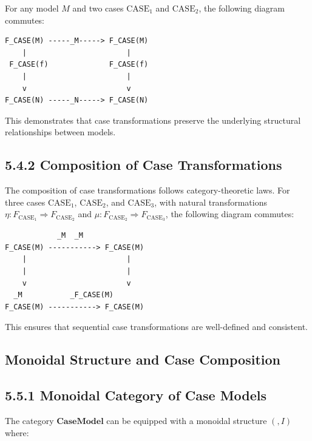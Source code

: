 \documentclass[
  11pt,
  letterpaper,
]{article}
\begin{document}
For any model \(M\) and two cases \(\text{CASE}_1\) and
\(\text{CASE}_2\), the following diagram commutes:

\begin{verbatim}
F_CASE(M) -----_M-----> F_CASE(M)
    |                       |
 F_CASE(f)              F_CASE(f)
    |                       |
    v                       v
F_CASE(N) -----_N-----> F_CASE(N)
\end{verbatim}

This demonstrates that case transformations preserve the underlying
structural relationships between models.

\hypertarget{composition-of-case-transformations}{%
\subsection{5.4.2 Composition of Case
Transformations}\label{composition-of-case-transformations}}

The composition of case transformations follows category-theoretic laws.
For three cases \(\text{CASE}_1\), \(\text{CASE}_2\), and
\(\text{CASE}_3\), with natural transformations
\(\eta: F_{\text{CASE}_1} \Rightarrow F_{\text{CASE}_2}\) and
\(\mu: F_{\text{CASE}_2} \Rightarrow F_{\text{CASE}_3}\), the following
diagram commutes:

\begin{verbatim}
            _M  _M
F_CASE(M) -----------> F_CASE(M)
    |                       |
    |                       |
    v                       v
  _M           _F_CASE(M)
F_CASE(M) -----------> F_CASE(M)
\end{verbatim}

This ensures that sequential case transformations are well-defined and
consistent.

\hypertarget{monoidal-structure-and-case-composition}{%
\subsection{Monoidal Structure and Case
Composition}\label{monoidal-structure-and-case-composition}}

\hypertarget{monoidal-category-of-case-models}{%
\subsection{5.5.1 Monoidal Category of Case
Models}\label{monoidal-category-of-case-models}}

The category \(\mathbf{CaseModel}\) can be equipped with a monoidal
structure \((, I)\) where:
\end{document}
